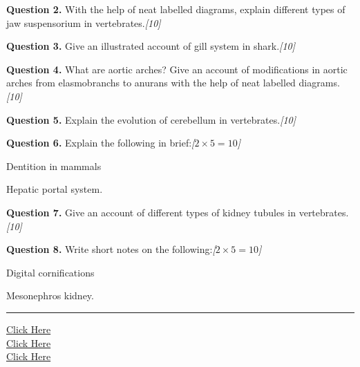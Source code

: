 \documentclass[11pt,a4paper]{article}
\newcommand{\pts}[1]{\hfill   \textit{[#1]}}
\begin{document}
\pagebreak

\medskip


\noindent   \textbf{Question 2.} With the help of neat labelled diagrams, explain different types of jaw suspensorium in vertebrates.\pts{10}

\medskip


\noindent   \textbf{Question 3.} Give an illustrated account of gill system in shark.\pts{10}

\medskip


\noindent   \textbf{Question 4.} What are aortic arches? Give an account of modifications in aortic arches from elasmobranchs to anurans with the help of neat labelled diagrams.\pts{10}

\medskip


\noindent   \textbf{Question 5.} Explain the evolution of cerebellum in vertebrates.\pts{10}

\medskip


\noindent   \textbf{Question 6.} Explain the following in brief:\pts{$2  \times 5 = 10$}

\begin{parts}
  \item Dentition in mammals
  \item Hepatic portal system.
\end{parts}

\medskip


\noindent   \textbf{Question 7.} Give an account of different types of kidney tubules in vertebrates.\pts{10}

\medskip


\noindent   \textbf{Question 8.} Write short notes on the following:\pts{$2  \times 5 = 10$}

\begin{parts}
  \item Digital cornifications
  \item Mesonephros kidney.
\end{parts}

\vfill
\rule{\linewidth}{0.4pt}

\begin{center}\small
\href{https://bhu-exam.vercel.app/}{Click Here}\\[4pt]\href{https://me-aryan.vercel.app/}{Click Here}\\[4pt]\href{https://quashan-me.vercel.app/}{Click Here}
\end{center}
\end{document}
